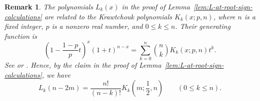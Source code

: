 \documentclass[10pt]{amsart}
\theoremstyle{plain}
\newtheorem{remark}[conjecture]{Remark}
\begin{document}
\begin{remark} \rm
The polynomials \( L_k(x) \) in the proof of
Lemma~\ref{lem:L-at-root-sign-calculations} are related to the
\emph{Krawtchouk polynomials} \( K_k(x;p,n) \), where \( n \) is a
fixed integer, \( p \) is a nonzero real number, and \( 0\le k\le n \). Their generating function is
\begin{equation}
\label{eq:general-Krawtchouk-generating-function}
 \left(1-\frac{1-p}{p}t\right)^x(1+t)^{n-x}
 =\sum_{k=0}^n\binom{n}{k} K_k(x;p,n)t^k.
\end{equation}
See
\cite[eqn.~(9.11.11)]{KLS} or \cite[eqn.~(18.23.3)]{NIST}.
Hence, by the claim in the proof of
Lemma~\ref{lem:L-at-root-sign-calculations}, we have
\[
 L_k(n-2m)=\frac{n!}{(n-k)!}
 K_k\left(m;\frac12,n\right)
 \qquad(0\leq k\leq n).
\]
\end{remark}
\end{document}
